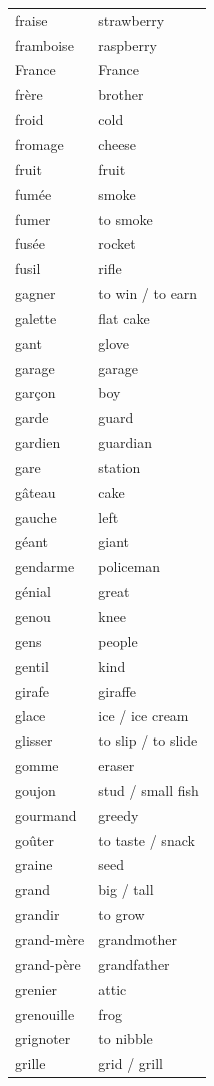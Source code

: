\documentclass[12pt,a4paper]{article}
\begin{document}
\begin{longtable}{p{4cm} p{6cm}}
fraise & strawberry \\
framboise & raspberry \\
France & France \\
frère & brother \\
froid & cold \\
fromage & cheese \\
fruit & fruit \\
fumée & smoke \\
fumer & to smoke \\
fusée & rocket \\
fusil & rifle \\
gagner & to win / to earn \\
galette & flat cake \\
gant & glove \\
garage & garage \\
garçon & boy \\
garde & guard \\
gardien & guardian \\
gare & station \\
gâteau & cake \\
gauche & left \\
géant & giant \\
gendarme & policeman \\
génial & great \\
genou & knee \\
gens & people \\
gentil & kind \\
girafe & giraffe \\
glace & ice / ice cream \\
glisser & to slip / to slide \\
gomme & eraser \\
goujon & stud / small fish \\
gourmand & greedy \\
goûter & to taste / snack \\
graine & seed \\
grand & big / tall \\
grandir & to grow \\
grand-mère & grandmother \\
grand-père & grandfather \\
grenier & attic \\
grenouille & frog \\
grignoter & to nibble \\
grille & grid / grill \\

\end{longtable}
\end{document}
